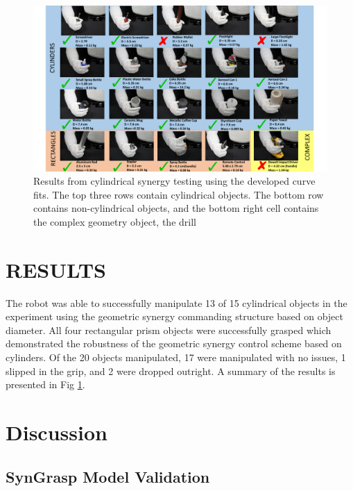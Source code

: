 \documentclass[runningheads,a4paper]{llncs}
\begin{document}
\begin{figure}[t]
 \centering
 \includegraphics[width=1.08\linewidth]{Objects3.pdf}
 \caption{Results from cylindrical synergy testing using the developed curve fits. The top three rows contain cylindrical objects. The bottom row contains non-cylindrical objects, and the bottom right cell contains the complex geometry object, the drill}
 \label{objects} 
\end{figure}

\section{RESULTS}
\label{results}

The robot was able to successfully manipulate 13 of 15 cylindrical objects in the experiment using the geometric synergy commanding structure based on object diameter. All four rectangular prism objects were successfully grasped which demonstrated the robustness of the geometric synergy control scheme based on cylinders. Of the 20 objects manipulated, 17 were manipulated with no issues, 1 slipped in the grip, and 2 were dropped outright. A summary of the results is presented in Fig \ref{objects}.
 

\paragraph{}
\section{Discussion}
\label{discussion}

\subsection{SynGrasp Model Validation}
\end{document}
